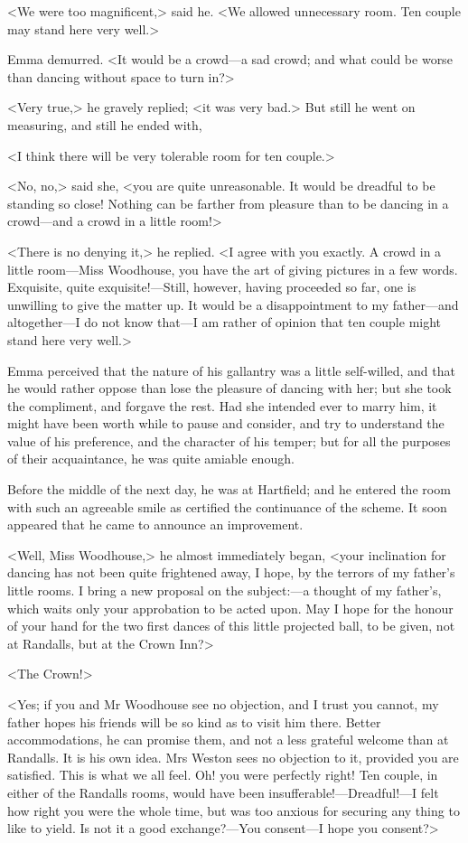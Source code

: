 <We were too magnificent,> said he. <We allowed unnecessary room. Ten couple may stand here very well.>

Emma demurred. <It would be a crowd—a sad crowd; and what could be worse than dancing without space to turn in?>

<Very true,> he gravely replied; <it was very bad.> But still he went on measuring, and still he ended with,

<I think there will be very tolerable room for ten couple.>

<No, no,> said she, <you are quite unreasonable. It would be dreadful to be standing so close! Nothing can be farther from pleasure than to be dancing in a crowd—and a crowd in a little room!>

<There is no denying it,> he replied. <I agree with you exactly. A crowd in a little room—Miss Woodhouse, you have the art of giving pictures in a few words. Exquisite, quite exquisite!—Still, however, having proceeded so far, one is unwilling to give the matter up. It would be a disappointment to my father—and altogether—I do not know that—I am rather of opinion that ten couple might stand here very well.>

Emma perceived that the nature of his gallantry was a little self-willed, and that he would rather oppose than lose the pleasure of dancing with her; but she took the compliment, and forgave the rest. Had she intended ever to marry him, it might have been worth while to pause and consider, and try to understand the value of his preference, and the character of his temper; but for all the purposes of their acquaintance, he was quite amiable enough.

Before the middle of the next day, he was at Hartfield; and he entered the room with such an agreeable smile as certified the continuance of the scheme. It soon appeared that he came to announce an improvement.

<Well, Miss Woodhouse,> he almost immediately began, <your inclination for dancing has not been quite frightened away, I hope, by the terrors of my father's little rooms. I bring a new proposal on the subject:—a thought of my father's, which waits only your approbation to be acted upon. May I hope for the honour of your hand for the two first dances of this little projected ball, to be given, not at Randalls, but at the Crown Inn?>

<The Crown!>

<Yes; if you and Mr Woodhouse see no objection, and I trust you cannot, my father hopes his friends will be so kind as to visit him there. Better accommodations, he can promise them, and not a less grateful welcome than at Randalls. It is his own idea. Mrs Weston sees no objection to it, provided you are satisfied. This is what we all feel. Oh! you were perfectly right! Ten couple, in either of the Randalls rooms, would have been insufferable!—Dreadful!—I felt how right you were the whole time, but was too anxious for securing any thing to like to yield. Is not it a good exchange?—You consent—I hope you consent?>

